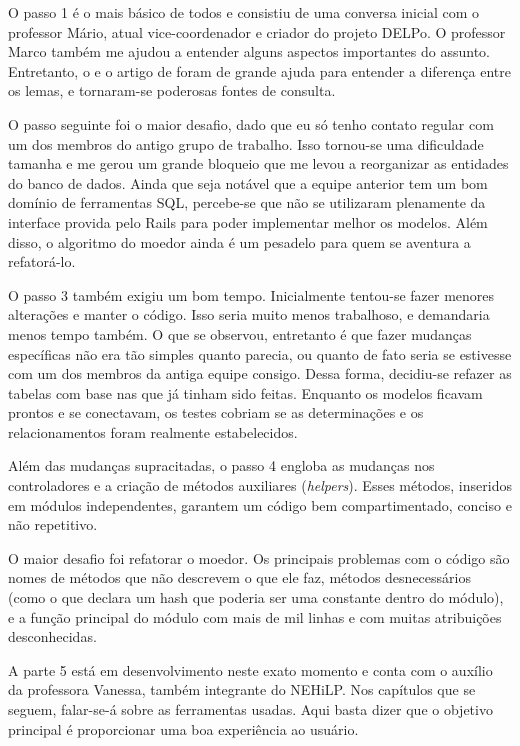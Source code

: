 O passo 1 é o mais básico de todos e consistiu de uma conversa inicial com o professor Mário, atual vice-coordenador
e criador do projeto DELPo. O professor Marco também me ajudou a entender alguns aspectos importantes do assunto.
Entretanto, o  e o artigo de \cite{Mar:17} foram de grande ajuda para entender a diferença entre os
lemas, e tornaram-se poderosas fontes de consulta.

O passo seguinte foi o maior desafio, dado que eu só tenho contato regular com um dos membros
do antigo grupo de trabalho. Isso tornou-se uma dificuldade tamanha e me gerou um grande bloqueio
que me levou a reorganizar as entidades do banco de dados. Ainda que seja notável que a equipe
anterior tem um bom domínio de ferramentas SQL, percebe-se que não se utilizaram plenamente da
interface provida pelo Rails para poder implementar melhor os modelos. Além disso, o algoritmo
do moedor ainda é um pesadelo para quem se aventura a refatorá-lo.

O passo 3 também exigiu um bom tempo. Inicialmente tentou-se fazer menores alterações e manter
o código. Isso seria muito menos trabalhoso, e demandaria menos tempo também. O que se observou,
entretanto é que fazer mudanças específicas não era tão simples quanto parecia, ou quanto de fato
seria se estivesse com um dos membros da antiga equipe consigo. Dessa forma, decidiu-se refazer as
tabelas com base nas que já tinham sido feitas. Enquanto os modelos ficavam prontos e se conectavam,
os testes cobriam se as determinações e os relacionamentos foram realmente estabelecidos.

Além das mudanças supracitadas, o passo 4 engloba as mudanças nos controladores e a criação de métodos
auxiliares (\emph{helpers}). Esses métodos, inseridos em módulos independentes, garantem um código bem
compartimentado, conciso e não repetitivo.

O maior desafio foi refatorar o moedor. Os principais problemas com o código são nomes de métodos que
não descrevem o que ele faz, métodos desnecessários (como o que declara um hash que poderia ser uma
constante dentro do módulo), e a função principal do módulo com mais de mil linhas e com muitas
atribuições desconhecidas.

A parte 5 está em desenvolvimento neste exato momento e conta com o auxílio da professora Vanessa,
também integrante do NEHiLP. Nos capítulos que se seguem, falar-se-á sobre as ferramentas usadas.
Aqui basta dizer que o objetivo principal é proporcionar uma boa experiência ao usuário.


